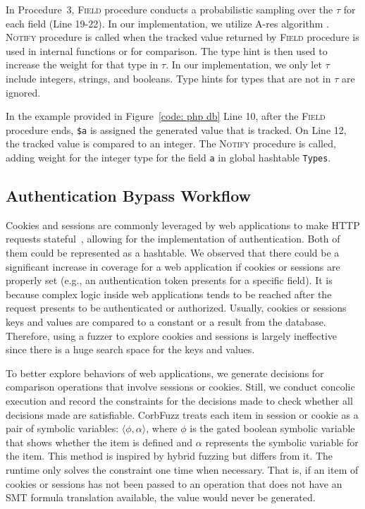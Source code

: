 \documentclass[10pt,conference]{IEEEtran}
\begin{document}
In Procedure~3, \textsc{Field} procedure conducts a probabilistic sampling over the $\tau$ for each field (Line 19-22). In our implementation, we utilize A-res algorithm \cite{vitter_random_1985}. \textsc{Notify} procedure is called when the tracked value returned by \textsc{Field} procedure is used in internal functions or for comparison. The type hint is then used to increase the weight for that type in $\tau$. In our implementation, we only let $\tau$ include integers, strings, and booleans. Type hints for types that are not in $\tau$ are ignored.  

In the example provided in Figure~\ref{code: php db} Line 10, after the \textsc{Field} procedure ends, \verb|$a| is assigned the generated value that is tracked. On Line 12, the tracked value is compared to an integer. The \textsc{Notify} procedure is called, adding weight for the integer type for the field \verb|a| in global hashtable \verb|Types|.

\subsection{Authentication Bypass Workflow}


Cookies and sessions are commonly leveraged by web applications to make HTTP requests stateful~\cite{authrev, web_two_decades}, allowing for the implementation of authentication. Both of them could be represented as a hashtable. We observed that there could be a significant increase in coverage for a web application if cookies or sessions are properly set (e.g., an authentication token presents for a specific field). It is because complex logic inside web applications tends to be reached after the request presents to be authenticated or authorized.
Usually, cookies or sessions keys and values are compared to a constant or a result from the database. Therefore, using a fuzzer to explore cookies and sessions is largely ineffective since there is a huge search space for the keys and values.

To better explore behaviors of web applications, we generate decisions for comparison operations that involve sessions or cookies. Still, we conduct concolic execution and record the constraints for the decisions made to check whether all decisions made are satisfiable. CorbFuzz treats each item in session or cookie as a pair of symbolic variables: $\langle \phi, \alpha \rangle$, where $\phi$ is the gated boolean symbolic variable that shows whether the item is defined and $\alpha$ represents the symbolic variable for the item. This method is inspired by hybrid fuzzing but differs from it. The runtime only solves the constraint one time when necessary. That is, if an item of cookies or sessions has not been passed to an operation that does not have an SMT formula translation available, the value would never be generated. %
\end{document}
